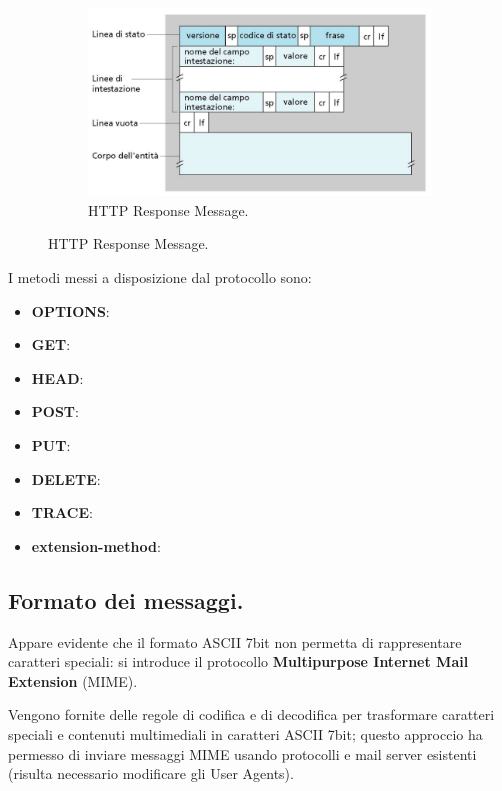 \documentclass[11pt, italian, openany]{book}
\begin{document}
\begin{sloppypar}
\begin{itemize}[topsep=0pt]
\begin{figure}[h!]
\begin{subfigure}{0.49 \linewidth}
		\end{subfigure}
		\begin{subfigure}{0.49 \linewidth} \centering
			\includegraphics[scale=0.25]{images/http-response.png}
			\caption{HTTP Response Message.}
		\end{subfigure}
	\end{figure}

	I metodi messi a disposizione dal protocollo sono:
	\vspace{-3.5mm}
	\begin{itemize}
		\itemsep-0.3em
		\item \textbf{OPTIONS}:
		\item \textbf{GET}:
		\item \textbf{HEAD}:
		\item \textbf{POST}:
		\item \textbf{PUT}:
		\item \textbf{DELETE}:
		\item \textbf{TRACE}:
		\item \textbf{extension-method}:
	\end{itemize}
\end{itemize}

\pagebreak

\subsection*{Formato dei messaggi.}
Appare evidente che il formato ASCII 7bit non permetta di rappresentare caratteri speciali: si introduce il protocollo \textbf{Multipurpose
Internet Mail Extension} (MIME). 

Vengono fornite delle regole di codifica e di decodifica per trasformare caratteri speciali e contenuti multimediali in caratteri ASCII 7bit;
questo approccio ha permesso di inviare messaggi MIME usando protocolli e mail server esistenti (risulta necessario modificare gli User Agents).


\end{sloppypar}
\end{document}
